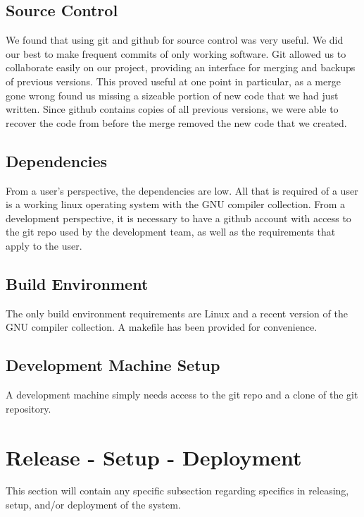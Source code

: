 \documentclass {article}
\begin{document}
		\subsection{\Large{\color{blue}Source Control}}
			We found that using git and github for source control was very useful. We did our
			 best to make frequent commits of only working software. Git allowed us to
			 collaborate easily on our project, providing an interface for merging and backups
			 of previous versions. This proved useful at one point in particular, as a merge 
			 gone wrong found us missing a sizeable portion of new code that we had just written.
			 Since github contains copies of all previous versions, we were able to recover
			 the code from before the merge removed the new code that we created.
			 
		\subsection{\Large{\color{blue}Dependencies}}
			From a user's perspective, the dependencies are low. All that is required of a user is
			 a working linux operating system with the GNU compiler collection. From a
			 development perspective, it is necessary to have a github account with access to the
			 git repo used by the development team, as well as the requirements that apply to the
			 user.
	
		\subsection{\Large{\color{blue}Build Environment}}
			The only build environment requirements are Linux and a recent version of the GNU
			 compiler collection. A makefile has been provided for convenience.
			 
		\subsection{\Large{\color{blue}Development Machine Setup}}
			A development machine simply needs access to the git repo and a clone of the git
			 repository.
	
	\newpage
	
	\section{\LARGE{\color{blue}Release - Setup - Deployment}}	
		This section will contain any specific subsection regarding specifics in releasing, setup,
		 and/or deployment of the system.	
	
\end{document}
